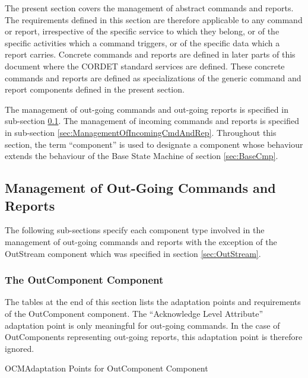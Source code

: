 \documentclass[a4paper,10pt]{article}
\newenvironment{cr_ap}[2]
{%
\begin{longtable}{|l|p{4.7cm}|p{4.9cm}|}
\caption{#2} \\
\hline
\rowcolor{light-gray}
\textbf{AP ID} & \textbf{Adaptation Point} & \textbf{Default Value}\\
\hline\hline
\endfirsthead
\rowcolor{light-gray}
\textbf{AP ID} & \textbf{Adaptation Point} & \textbf{Default Value}\\
\hline\hline
\endhead
\DTLforeach*[\DTLiseq{\cat}{#1}]{dbAP}{\cat=Category,\id=Id,\ap=AP,\defValue=DefValue}
{\DTLiffirstrow{}{\\\hline}\cat-\id & \ap & \defValue}\\\hline
}
{\end{longtable}}
\begin{document}
The present section covers the management of abstract commands and reports. The requirements defined in this section are therefore applicable to any command or report, irrespective of the specific service to which they belong, or of the specific activities which a command triggers, or of the specific data which a report carries. Concrete commands and reports are defined in later parts of this document where the CORDET standard services are defined. These concrete commands and reports are defined as specializations of the generic command and report components defined in the present section. 

The management of out-going commands and out-going reports is specified in sub-section \ref{sec:ManagementOfOutGoingCmdAndRep}. The management of incoming commands and reports is specified in sub-section \ref{sec:ManagementOfIncomingCmdAndRep}. Throughout this section, the term “component” is used to designate a component whose behaviour extends the behaviour of the Base State Machine of section \ref{sec:BaseCmp}. 

\subsection{Management of Out-Going Commands and Reports}\label{sec:ManagementOfOutGoingCmdAndRep}
 

The following sub-sections specify each component type involved in the management of out-going commands and reports with the exception of the OutStream component which was specified in section \ref{sec:OutStream}. 

\subsubsection{The OutComponent Component}\label{sec:OutComponent}
 

The tables at the end of this section lists the adaptation points and requirements of the OutComponent component. The “Acknowledge Level Attribute” adaptation point is only meaningful for out-going commands. In the case of OutComponents representing out-going reports, this adaptation point is therefore ignored.

\begin{cr_ap}{OCM}{Adaptation Points for OutComponent Component}
\end{cr_ap}
\end{document}
